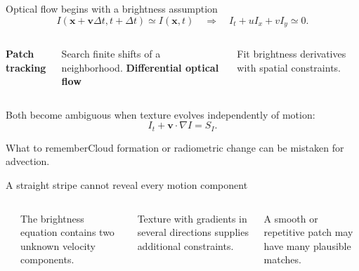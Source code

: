 \documentclass[aspectratio=169,11pt]{beamer}
\newcommand{\prov}{}
\newcommand{\evidence}[1]{\gdef\prov{#1}}
\newcommand{\takeaway}[1]{\vspace{0.3em}\begin{block}{What to remember}#1\end{block}}
\begin{document}
\evidence{Original optical-flow derivation; an explanatory comparison, not undocumented Tracker internals.}
\begin{frame}{Optical flow begins with a brightness assumption}
 \[
 I(\bm x+\bm v\Delta t,t+\Delta t)\simeq I(\bm x,t)
 \quad\Longrightarrow\quad I_t+uI_x+vI_y\simeq0.
 \]
 \begin{columns}[T]
 \textbf{Patch tracking}\par
 Search finite shifts of a neighborhood.
 \textbf{Differential optical flow}\par
 Fit brightness derivatives with spatial constraints.
 \end{columns}
 \vspace{0.5cm}
 Both become ambiguous when texture evolves independently of motion:
 \[
 I_t+\bm v\cdot\nabla I=S_I.
 \]
 \takeaway{Cloud formation or radiometric change can be mistaken for advection.}
\end{frame}

\evidence{Original aperture-problem illustration. Arrows are hypothetical motions.}
\begin{frame}{A straight stripe cannot reveal every motion component}
 \begin{columns}[c]
 \begin{center}
 \end{center}
 The brightness equation contains two unknown velocity components.
 \par\medskip
 Texture with gradients in several directions supplies additional constraints.
 \par\medskip
 A smooth or repetitive patch may have many plausible matches.
 \end{columns}
\end{frame}
\end{document}

